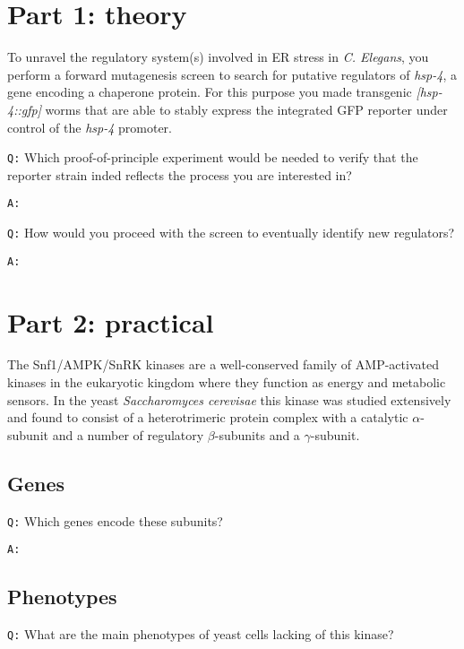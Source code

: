 \documentclass[11pt, a4paper,titlepage]{article}
\begin{document}

\setcounter{tocdepth}{3}

\tableofcontents
\newpage

\section*{Part 1: theory}

To unravel the regulatory system(s) involved in ER stress in
\emph{C. Elegans}, you perform a forward mutagenesis screen to search
for putative regulators of \emph{hsp-4}, a gene encoding a chaperone
protein. For this purpose you made transgenic \emph{[hsp-4::gfp]}
worms that are able to stably express the integrated GFP reporter
under control of the \emph{hsp-4} promoter.
\bigskip

\noindent\texttt{Q:} Which proof-of-principle experiment would be needed to
verify that the reporter strain inded reflects the process you are
interested in?
\smallskip

\noindent\texttt{A:} 
\bigskip

\noindent\texttt{Q:} How would you proceed with the screen to
eventually identify new regulators?
\smallskip

\noindent\texttt{A:} 

\section*{Part 2: practical}

The Snf1/AMPK/SnRK kinases are a well-conserved family of
AMP-activated kinases in the eukaryotic kingdom where they function as
energy and metabolic sensors. In the yeast \emph{Saccharomyces
  cerevisae} this kinase was studied extensively and found to consist
of a heterotrimeric protein complex with a catalytic $\alpha$-subunit
and a number of regulatory $\beta$-subunits and a $\gamma$-subunit.

\subsection*{Genes}

\texttt{Q:} Which genes encode these subunits?
\smallskip

\noindent\texttt{A:} 

\subsection*{Phenotypes}
\texttt{Q:} What are the main phenotypes of yeast cells lacking of
this kinase?
\smallskip
\end{document}
